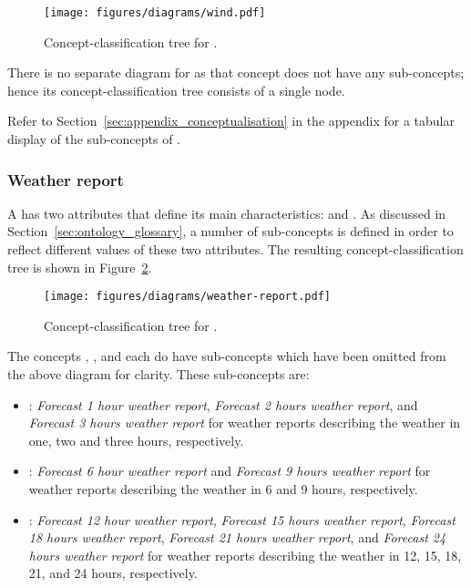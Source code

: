\begin{itemize}
\begin{itemize}
    \end{itemize}
    
  \begin{figure}
    \centering
    \texttt{[image: figures/diagrams/wind.pdf]}
    \caption[Concept-classification tree for ]{Concept-classification tree for .}
    \label{fig:tree_wind}
  \end{figure}

\end{itemize}

There is no separate diagram for  as that concept does not have any sub-concepts; hence its concept-classification tree consists of a single node.

Refer to Section~\ref{sec:appendix_conceptualisation} in the appendix for a tabular display of the sub-concepts of .

\subsubsection{Weather report}

A  has two attributes that define its main characteristics:  and . As discussed in Section~\ref{sec:ontology_glossary}, a number of sub-concepts is defined in order to reflect different values of these two attributes. The resulting concept-classification tree is shown in Figure~\ref{fig:tree_weather_report}.

\begin{figure}
  \centering
  \texttt{[image: figures/diagrams/weather-report.pdf]}
  \caption[Concept-classification tree for ]{Concept-classification tree for .}
  \label{fig:tree_weather_report}
\end{figure}

The concepts , , and  each do have sub-concepts which have been omitted from the above diagram for clarity. These sub-concepts are:
\begin{itemize}
  \item {}: \emph{Forecast 1 hour weather report}, \emph{Forecast 2 hours weather report}, and \emph{Forecast 3 hours weather report} for weather reports describing the weather in one, two and three hours, respectively.
  \item {}: \emph{Forecast 6 hour weather report} and \emph{Forecast 9 hours weather report} for weather reports describing the weather in 6 and 9 hours, respectively.
  \item {}: \emph{Forecast 12 hour weather report}, \emph{Forecast 15 hours weather report}, \emph{Forecast 18 hours weather report}, \emph{Forecast 21 hours weather report}, and \emph{Forecast 24 hours weather report} for weather reports describing the weather in 12, 15, 18, 21, and 24 hours, respectively.
\end{itemize}


